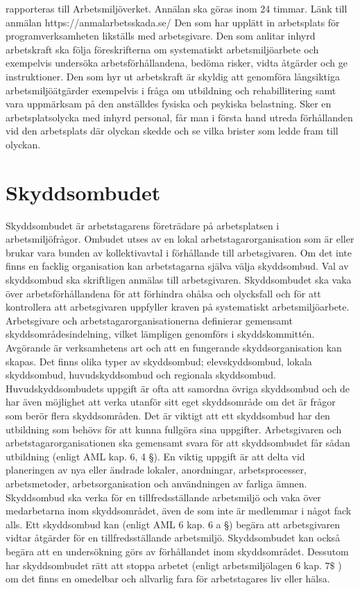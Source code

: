 rapporteras till Arbetsmiljöverket. Annälan ska göras inom 24 timmar. Länk till anmälan https://anmalarbetsskada.se/
Den som har upplätt in arbetsplats för programverksamheten likställs med arbetsgivare. Den som anlitar inhyrd arbetskraft ska följa föreskrifterna om systematiskt arbetsmiljöarbete och exempelvis undersöka arbetsförhållandena, bedöma risker, vidta åtgärder och ge instruktioner. Den som hyr ut arbetskraft är skyldig att genomföra långsiktiga arbetsmiljöätgärder exempelvis i fråga om utbildning och rehabillitering samt vara uppmärksam på den anställdes fysiska och psykiska belastning. Sker en arbetsplatsolycka med inhyrd personal, får man i första hand utreda förhållanden vid den arbetsplats där olyckan skedde och se vilka brister som ledde fram till olyckan.
\section*{Skyddsombudet}
Skyddsombudet är arbetstagarens företrädare på arbetsplatsen i arbetsmiljöfrågor. Ombudet utses av en lokal arbetstagarorganisation som är eller brukar vara bunden av kollektivavtal i förhållande till arbetsgivaren. Om det inte finns en facklig organisation kan arbetstagarna själva välja skyddsombud. Val av skyddsombud ska skriftligen anmälas till arbetsgivaren. Skyddsombudet ska vaka över arbetsförhållandena för att förhindra ohålsa och olycksfall och för att kontrollera att arbetsgivaren uppfyller kraven på systematiskt arbetsmiljöarbete.
Arbetsgivare och arbetstagarorganisationerna definierar gemensamt skyddsområdesindelning, vilket lämpligen genomförs i skyddskommittén. Avgörande är verksamhetens art och att en fungerande skyddsorganisation kan skapas. Det finns olika typer av skyddsombud; elevskyddsombud, lokala skyddsombud, huvudskyddsombud och regionala skyddsombud.
Huvudskyddsombudets uppgift är ofta att samordna övriga skyddsombud och de har även möjlighet att verka utanför sitt eget skyddsområde om det är frågor som berör flera skyddsområden. Det är viktigt att ett skyddsombud har den utbildning som behövs för att kunna fullgöra sina uppgifter. Arbetsgivaren och arbetstagarorganisationen ska gemensamt svara för att skyddsombudet får sådan utbildning (enligt AML kap. 6, 4 §).
En viktig uppgift är att delta vid planeringen av nya eller ändrade lokaler, anordningar, arbetsprocesser, arbetsmetoder, arbetsorganisation och användningen av farliga ämnen. Skyddsombud ska verka för en tillfredsställande arbetsmiljö och vaka över medarbetarna inom skyddsområdet, även de som inte är medlemmar i något fack alls.
Ett skyddsombud kan (enligt AML 6 kap. 6 a §) begära att arbetsgivaren vidtar åtgärder för en tillfredsställande arbetsmiljö. Skyddsombudet kan också begära att en undersökning görs av förhållandet inom skyddsområdet. Dessutom har skyddsombudet rätt att stoppa arbetet (enligt arbetsmiljölagen 6 kap. \(7 \$\) ) om det finns en omedelbar och allvarlig fara för arbetstagares liv eller hälsa.

